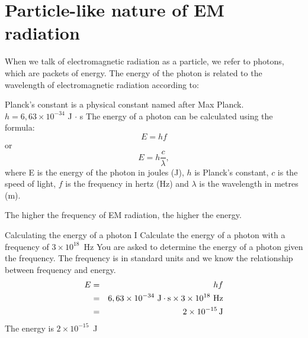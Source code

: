             \section{Particle-like nature of EM radiation}
            \nopagebreak
      \label{m38778*id188832}When we talk of electromagnetic radiation as a particle, we refer to photons, which are packets of energy. The energy of the photon is related to the wavelength of electromagnetic radiation according to:\par 
{} {Planck's constant is a physical constant named after Max Planck.\\ $h=6,63\ensuremath{\times}{10}^{-34}$ J $\ensuremath{\cdot}$ s} 
      \label{m38778*id188898}The energy of a photon can be calculated using the formula: 
\begin{equation*}
\boxed{E=hf}
\end{equation*} 
or 
\begin{equation*}
\boxed{E=h\frac{c}{\lambda}},
\end{equation*}where E is the energy of the photon in joules (J), $h$ is Planck's constant, $c$ is the speed of light, $f$ is the frequency in hertz (Hz) and $\lambda $ is the wavelength in metres (m).\par The higher the frequency of EM radiation, the higher the energy. 
      \begin{wex}{Calculating the energy of a photon I}{
      \label{m38778*id188962}Calculate the energy of a photon with a frequency of $3\ensuremath{\times}{10}^{18}$~Hz}{
You are asked to determine the energy of a photon given the frequency. The frequency is in standard units and we know the relationship between frequency and energy.
    \begin{eqnarray*}
    E& =& hf\\ 
     & =& 6,63\ensuremath{\times}{10}^{-34}~\text{J}\cdot\text{s}\ensuremath{\times}3\ensuremath{\times}{10}^{18}~\text{Hz}\\ 
     & =& 2\ensuremath{\times}{10}^{-15}\phantom{\rule{0.166667em}{0ex}}\text{J}
      \end{eqnarray*}
  The energy is $2\times{10}^{-15}$~J}\end{wex}
 \vspace{.5cm}   

